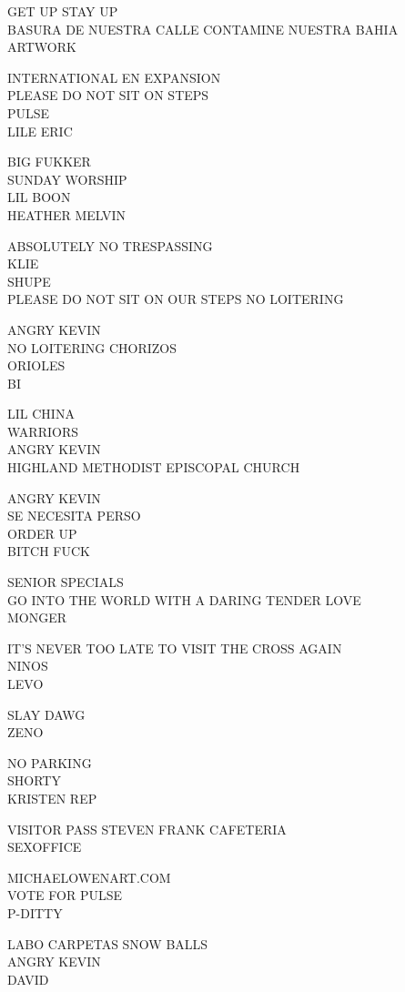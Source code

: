 \documentclass[10pt,letterpaper]{article}
\begin{document}
GET UP STAY UP\\
BASURA DE NUESTRA CALLE CONTAMINE NUESTRA BAHIA\\
ARTWORK

INTERNATIONAL EN EXPANSION\\
PLEASE DO NOT SIT ON STEPS\\
PULSE\\
LILE ERIC

BIG FUKKER\\
SUNDAY WORSHIP\\
LIL BOON\\
HEATHER MELVIN

ABSOLUTELY NO TRESPASSING\\
KLIE\\
SHUPE\\
PLEASE DO NOT SIT ON OUR STEPS NO LOITERING

ANGRY KEVIN\\
NO LOITERING CHORIZOS\\
ORIOLES\\
BI

LIL CHINA\\
WARRIORS\\
ANGRY KEVIN\\
HIGHLAND METHODIST EPISCOPAL CHURCH

ANGRY KEVIN\\
SE NECESITA PERSO\\
ORDER UP\\
BITCH FUCK

SENIOR SPECIALS\\
GO INTO THE WORLD WITH A DARING TENDER LOVE\\
MONGER

IT'S NEVER TOO LATE TO VISIT THE CROSS AGAIN\\
NINOS\\
LEVO

SLAY DAWG\\
ZENO

NO PARKING\\
SHORTY\\
KRISTEN REP

VISITOR PASS STEVEN FRANK CAFETERIA\\
SEXOFFICE

MICHAELOWENART.COM\\
VOTE FOR PULSE\\
P{-}DITTY

LABO CARPETAS SNOW BALLS\\
ANGRY KEVIN\\
DAVID
\end{document}
